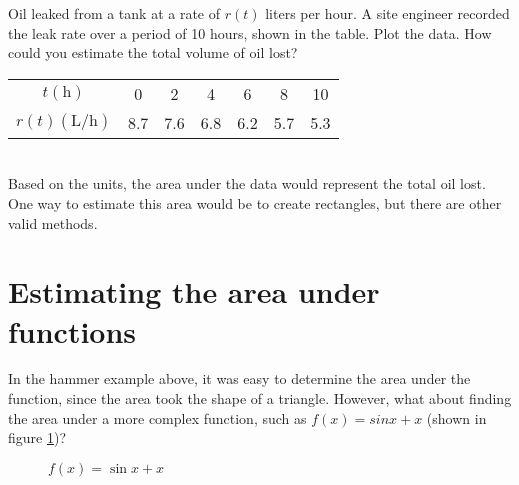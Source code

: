 \begin{Exercise}[label=units3]
	Oil leaked from a tank at a rate of $r(t)$ liters per hour. A site engineer recorded the leak rate over a period of 10 hours, shown in the table. Plot the data. How could you estimate the total volume of oil lost?\\
	\begin{tabular}{c|c|c|c|c|c|c}
	$t(\text{h})$ & 0 & 2 & 4 & 6 & 8 & 10 \\
	$r(t)(\text{L/h})$ & 8.7 & 7.6 & 6.8 & 6.2 & 5.7 & 5.3 \\
	\end{tabular}
\end{Exercise}

\begin{Answer}[ref=units3]
	\\
	Based on the units, the area under the data would represent the total oil lost. One way to estimate this area would be to create rectangles, but there are other valid methods. 
\end{Answer}

\section{Estimating the area under functions}

In the hammer example above, it was easy to determine the area under the function, since the area took the shape of a triangle. However, what about finding the area under a more complex function, such as $f(x) = sin{x}+x$ (shown in figure \ref{fig:riemannsine})?

\begin{figure}[htbp]
	\centering
	\caption{$f(x) = \sin{x}+x$}
	\label{fig:riemannsine}
\end{figure} 

